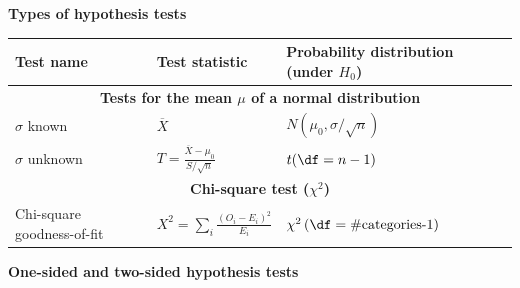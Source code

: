 \documentclass[11pt,a4paper,english]{article} %
\begin{document}
\textbf{Types of hypothesis tests}
\begin{table}[H]
    \centering
    \renewcommand{\arraystretch}{1.5}
    \begin{tabular}{m{}m{}m{}}
        \toprule
            \textbf{Test name} & \textbf{Test statistic} & \textbf{Probability distribution (under $H_0$)} \\
        \midrule
            \multicolumn{3}{c}{\textbf{Tests for the mean $\mu$ of a normal distribution}} \\ 
        \midrule
            $\sigma$ known    & $\overline{X}$ & $N(\mu_0, \sigma / \sqrt{n})$ \\
            $\sigma$ unknown  & $T = \frac{\overline{X} - \mu_0}{S / \sqrt{n}}$ & $t(\df=n-1)$ \\
        \midrule
            \multicolumn{3}{c}{\textbf{Chi-square test ($\chi^2$)}} \\
        \midrule
            Chi-square \newline goodness-of-fit & $X^2 = \sum_{i} \frac{(O_{i} - E_{i})^2}{E_{i}}$ & $\chi^2\left(\df=\text{\#categories-1}\right)$ \\
        \bottomrule
    \end{tabular}
\end{table}

\textbf{One-sided and two-sided hypothesis tests}
\end{document}
